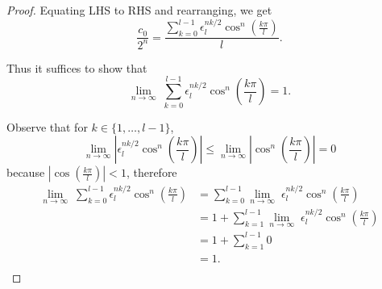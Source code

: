 \documentclass{article}
\begin{document}
\begin{enumerate}[label={\bf Q\arabic*:}]
\begin{proof}
      Equating LHS to RHS and rearranging, we get
      \[\frac{c_0}{2^n}
      =\frac{\sum_{k=0}^{l-1}
      \epsilon_l^{nk/2}\cos^n\left(\frac{k\pi}{l}\right)}{l}.\]

      Thus it suffices to show that 
      \[\lim_{n\rightarrow\infty}\; \sum_{k=0}^{l-1}
      \epsilon_l^{nk/2}\cos^n\left(\frac{k\pi}{l}\right) =1.\]

      Observe that for $k\in\{1,\ldots,l-1\}$,
      \[\lim_{n\rightarrow\infty}
      \left|\epsilon_l^{nk/2}\cos^n\left(\frac{k\pi}{l}\right)\right|
      \leq\lim_{n\rightarrow\infty}
      \left|\cos^n\left(\frac{k\pi}{l}\right)\right|=0\]
      because $\left|\cos\left(\frac{k\pi}{l}\right)\right|<1$, therefore
      \begin{align*}
        \lim_{n\rightarrow\infty}\; \sum_{k=0}^{l-1}
          \epsilon_l^{nk/2}\cos^n\left(\frac{k\pi}{l}\right)
        &=\sum_{k=0}^{l-1} \lim_{n\rightarrow\infty}\;
          \epsilon_l^{nk/2}\cos^n\left(\frac{k\pi}{l}\right)\\
        &=1+\sum_{k=1}^{l-1} \lim_{n\rightarrow\infty}\;
          \epsilon_l^{nk/2}\cos^n\left(\frac{k\pi}{l}\right)\\
        &=1+\sum_{k=1}^{l-1}0\\
        &=1.\\
      \end{align*}
    \end{proof}
\end{enumerate}
\end{document}
